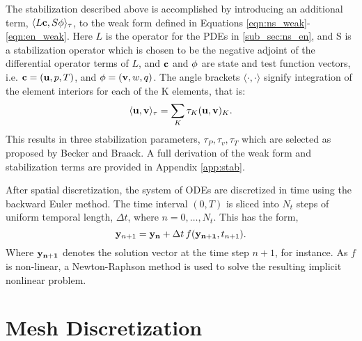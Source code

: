 The stabilization described above is accomplished by introducing an additional term,
$\langle L{\bf c},S {\bf \phi} \rangle_\tau$, to the weak form defined in Equations
\ref{eqn:ns_weak}-\ref{eqn:en_weak}. Here $L$ is the operator for the PDEs
in \ref{sub_sec:ns_en}, and S is a stabilization operator
which is chosen to be the negative adjoint of the differential operator
terms of $L$, and ${\bf c}$ and ${\bf \phi}$ are state and test
function vectors, i.e. $ {\bf c}= ({\bf u},p,T)$, and ${\bf \phi} = (
{\bf v},w,q )$. The angle brackets $\langle \cdot,\cdot \rangle$ signify
integration of the element interiors for each of the K elements, that is:
\begin{equation}
 \langle {\bf u},{\bf v} \rangle_\tau = \sum_K \tau_K({\bf u},{\bf
  v})_K.\label{eq:tau}
\end{equation}
This results in three stabilization parameters, $\tau_P, \tau_v, \tau_T$ 
which are selected as proposed by Becker and Braack. 
A full derivation of the weak form and stabilization terms are provided
in Appendix \ref{app:stab}. 

After spatial discretization, the system of ODEs are discretized in time
using the backward Euler method\cite{moin2010fundamentals}. The time
interval $(0,T)$ is sliced into $N_t$ steps of uniform temporal length,
$\Delta t$, where $n = 0,\dots,N_t$.  
This has the form, 
\begin{equation}
 {\bf y}_{n+1} = {\bf y_n } + \Delta t \, f({\bf y_{n+1}},t_{n+1}).
\end{equation}
Where ${\bf y_{n+1}}$ denotes the solution vector at the time step $n+1$, for
instance. As $f$ is non-linear, a Newton-Raphson method is used to solve
the resulting implicit nonlinear problem. 


%
%


\section{Mesh Discretization}


